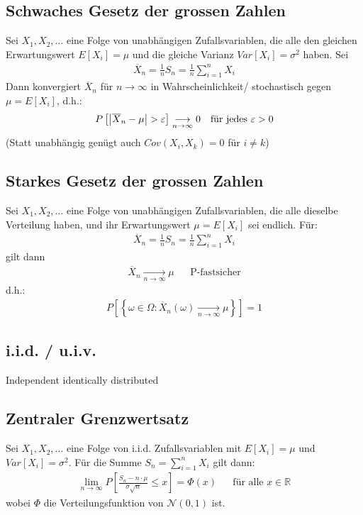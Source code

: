 \documentclass[8pt]{extarticle}
\newcommand{\R}{\mathbb{R}}
\newcommand{\ra}{\rightarrow}
\newcommand{\Sn}{\sum_{i = 1}^n}
\newcommand{\Standardnormalverteilt}{\mathcal{N}(0, 1)}
\begin{document}
\begin{multicols*}{3}
  \subsection*{Schwaches Gesetz der grossen Zahlen}
  Sei $X_1, X_2, \dots$ eine Folge von unabhängigen Zufallsvariablen,
  die alle den gleichen Erwartungswert $E[X_i] = \mu$ und die gleiche
  Varianz $Var[X_i] = \sigma^2$ haben. Sei
  \begin{align*}
    \overline{X}_n = \frac{1}{n} S_n = \frac{1}{n} \Sn X_i
  \end{align*}
  Dann konvergiert $\overline{X}_n$ für $n \ra \infty$ in Wahrscheinlichkeit/
  stochastisch gegen $\mu = E[X_i]$, d.h.:
  \begin{align*}
    P \left[ \abs{\overline{X}_n - \mu} > \varepsilon \right] \underset{n \ra \infty}{\longrightarrow} 0
     &  & \text{für jedes } \varepsilon > 0
  \end{align*}
  (Statt unabhängig genügt auch $Cov(X_i, X_k) = 0$ für $i \neq k$)
  \subsection*{Starkes Gesetz der grossen Zahlen}
  Sei $X_1, X_2, \dots$ eine Folge von unabhängigen Zufallsvariablen,
  die alle dieselbe Verteilung haben, und ihr Erwartungswert
  $\mu = E[X_i]$ sei endlich. Für:
  \begin{align*}
    \overline{X}_n = \frac{1}{n} S_n = \frac{1}{n} \Sn X_i
  \end{align*}
  gilt dann
  \begin{align*}
    \overline{X}_n \underset{n \ra \infty}{\longrightarrow} \mu &  & \text{P-fastsicher}
  \end{align*}
  d.h.:
  \begin{align*}
    P \left[ \left\{ \omega \in \Omega : \overline{X}_n(\omega) \underset{n \ra \infty}{\longrightarrow} \mu \right\} \right] = 1
  \end{align*}
  \subsection*{i.i.d. / u.i.v.}
  Independent identically distributed
  \subsection*{Zentraler Grenzwertsatz}
  Sei $X_1, X_2, \dots$ eine Folge von i.i.d. Zufallsvariablen mit
  $E[X_i] = \mu$ und $Var[X_i] = \sigma^2$. Für die Summe $S_n = \Sn X_i$
  gilt dann:
  \begin{align*}
    \lim_{n \ra \infty} P \left[ \frac{S_n - n \cdot \mu}{\sigma \sqrt{n}} \leq x \right] = \Phi(x)
     &  & \text{für alle } x \in \R
  \end{align*}
  wobei $\Phi$ die Verteilungsfunktion von $\Standardnormalverteilt$ ist.

\end{multicols*}
\end{document}

